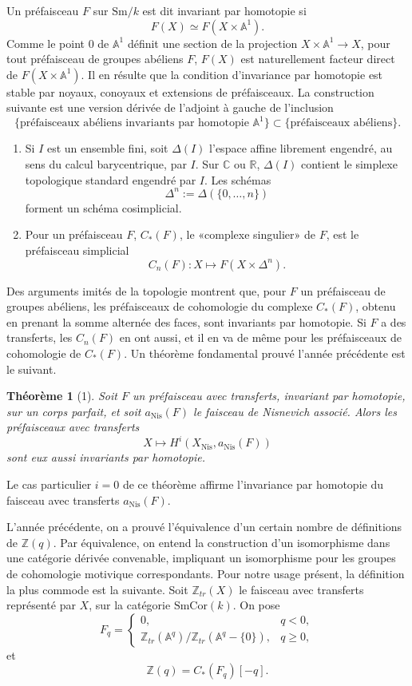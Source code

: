 \documentclass[11pt]{article}
\newcommand{\Aone}{\mathbb A^1}
\newcommand{\A}{\mathbb A}
\newcommand{\Z}{\mathbb Z}
\newcommand{\Nis}{\mathrm{Nis}}
\newcommand{\Sm}{\mathrm{Sm}}
\newcommand{\SmCor}{\mathrm{SmCor}}
\theoremstyle{deligne}
\newtheorem*{theorem*}{Théorème}
\newcommand{\heading}[1]{\vspace{0.7em}\noindent{\bfseries #1}\quad}
\begin{document}
\heading{1.4.} Un préfaisceau \(F\) sur \(\Sm/k\) est dit invariant par homotopie si
\[
  F(X)\simeq F(X\times\Aone).
\]
Comme le point \(0\) de \(\Aone\) définit une section de la projection \(X\times\Aone\to X\), pour tout préfaisceau de groupes abéliens \(F\), \(F(X)\) est naturellement facteur direct de \(F(X\times\Aone)\). Il en résulte que la condition d'invariance par homotopie est stable par noyaux, conoyaux et extensions de préfaisceaux. La construction suivante est une version dérivée de l'adjoint à gauche de l'inclusion
\[
  \{\text{préfaisceaux abéliens invariants par homotopie }\Aone\}
  \subset
  \{\text{préfaisceaux abéliens}\}.
\]
\begin{enumerate}[label=(\alph*)]
\item Si \(I\) est un ensemble fini, soit \(\Delta(I)\) l'espace affine librement engendré, au sens du calcul barycentrique, par \(I\). Sur \(\mathbb C\) ou \(\mathbb R\), \(\Delta(I)\) contient le simplexe topologique standard engendré par \(I\). Les schémas
\[
  \Delta^n:=\Delta(\{0,\ldots,n\})
\]
forment un schéma cosimplicial.
\item Pour un préfaisceau \(F\), \(C_*(F)\), le «complexe singulier» de \(F\), est le préfaisceau simplicial
\[
  C_n(F):X\longmapsto F(X\times\Delta^n).
\]
\end{enumerate}
Des arguments imités de la topologie montrent que, pour \(F\) un préfaisceau de groupes abéliens, les préfaisceaux de cohomologie du complexe \(C_*(F)\), obtenu en prenant la somme alternée des faces, sont invariants par homotopie. Si \(F\) a des transferts, les \(C_n(F)\) en ont aussi, et il en va de même pour les préfaisceaux de cohomologie de \(C_*(F)\). Un théorème fondamental prouvé l'année précédente est le suivant.

\begin{theorem*}[1]
Soit \(F\) un préfaisceau avec transferts, invariant par homotopie, sur un corps parfait, et soit \(a_{\Nis}(F)\) le faisceau de Nisnevich associé. Alors les préfaisceaux avec transferts
\[
  X\longmapsto H^i(X_{\Nis},a_{\Nis}(F))
\]
sont eux aussi invariants par homotopie.
\end{theorem*}

Le cas particulier \(i=0\) de ce théorème affirme l'invariance par homotopie du faisceau avec transferts \(a_{\Nis}(F)\).

L'année précédente, on a prouvé l'équivalence d'un certain nombre de définitions de \(\Z(q)\). Par équivalence, on entend la construction d'un isomorphisme dans une catégorie dérivée convenable, impliquant un isomorphisme pour les groupes de cohomologie motivique correspondants. Pour notre usage présent, la définition la plus commode est la suivante. Soit \(\Z_{tr}(X)\) le faisceau avec transferts représenté par \(X\), sur la catégorie \(\SmCor(k)\). On pose
\[
  F_q=
  \begin{cases}
  0, & q<0,\\
  \Z_{tr}(\A^q)/\Z_{tr}(\A^q-\{0\}), & q\ge0,
  \end{cases}
\]
et
\[
  \Z(q)=C_*(F_q)[-q].
\]
\end{document}
